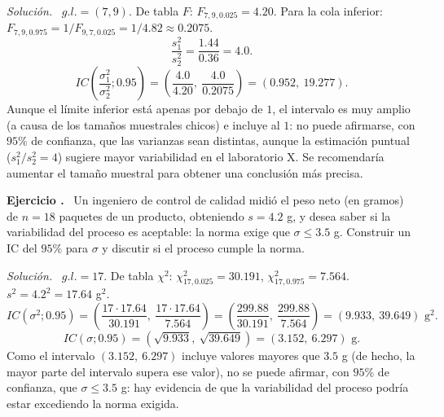 \documentclass[11pt,a4paper]{article}
\newcounter{ejnum}
\newenvironment{ejercicio}{\refstepcounter{ejnum}\par\medskip\noindent\textbf{Ejercicio \theejnum.}~}{\par}
\newenvironment{solucion}{\par\noindent\textit{Solución.}~}{\par\vspace{1em}}
\begin{document}
\begin{solucion}
$g.l.=(7,9)$. De tabla $F$: $F_{7,9,0.025}=4.20$. Para la cola inferior: $F_{7,9,0.975}=1/F_{9,7,0.025}=1/4.82\approx 0.2075$.
\[
\frac{s_1^2}{s_2^2} = \frac{1.44}{0.36} = 4.0.
\]
\[
IC\left(\frac{\sigma_1^2}{\sigma_2^2};0.95\right) = \left(\frac{4.0}{4.20},\ \frac{4.0}{0.2075}\right) = (0.952,\ 19.277).
\]
Aunque el límite inferior está apenas por debajo de $1$, el intervalo es muy amplio (a causa de los tamaños muestrales chicos) e incluye al $1$: no puede afirmarse, con $95\%$ de confianza, que las varianzas sean distintas, aunque la estimación puntual ($s_1^2/s_2^2=4$) sugiere mayor variabilidad en el laboratorio X. Se recomendaría aumentar el tamaño muestral para obtener una conclusión más precisa.
\end{solucion}

\begin{ejercicio}
Un ingeniero de control de calidad midió el peso neto (en gramos) de $n=18$ paquetes de un producto, obteniendo $s=4.2$ g, y desea saber si la variabilidad del proceso es aceptable: la norma exige que $\sigma \le 3.5$ g. Construir un IC del $95\%$ para $\sigma$ y discutir si el proceso cumple la norma.
\end{ejercicio}

\begin{solucion}
$g.l.=17$. De tabla $\chi^2$: $\chi^2_{17,0.025}=30.191$, $\chi^2_{17,0.975}=7.564$. $s^2=4.2^2=17.64$ g$^2$.
\[
IC(\sigma^2;0.95) = \left(\frac{17\cdot 17.64}{30.191},\ \frac{17\cdot 17.64}{7.564}\right) = \left(\frac{299.88}{30.191},\ \frac{299.88}{7.564}\right) = (9.933,\ 39.649) \text{ g}^2.
\]
\[
IC(\sigma;0.95) = (\sqrt{9.933},\ \sqrt{39.649}) = (3.152,\ 6.297) \text{ g}.
\]
Como el intervalo $(3.152,\ 6.297)$ incluye valores mayores que $3.5$ g (de hecho, la mayor parte del intervalo supera ese valor), no se puede afirmar, con $95\%$ de confianza, que $\sigma\le 3.5$ g: hay evidencia de que la variabilidad del proceso podría estar excediendo la norma exigida.
\end{solucion}
\end{document}
